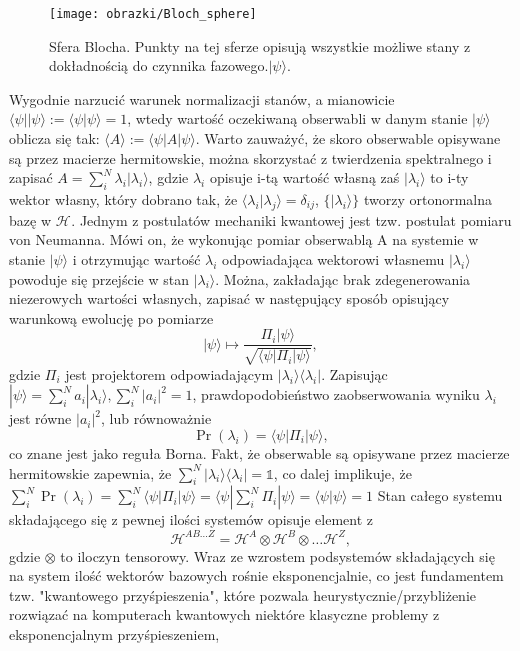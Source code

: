 \documentclass[10pt]{article} %
\newcommand{\Hx}[1]{\mathcal{H}^{#1}}
\newcommand{\Pro}[1]{\Pr(#1)}
\newcommand{\Ket}[1]{|#1\rangle}
\newcommand{\Bra}[1]{\langle#1|}
\newcommand{\Braket}[1]{\langle#1\rangle}
\newcommand{\KP}{\Ket{\psi}}
\newcommand{\BP}{\Bra{\psi}}
\begin{document}
\begin{figure}[t]
\centering
\texttt{[image: obrazki/Bloch\_sphere]}
\caption{Sfera Blocha. Punkty na tej sferze opisują wszystkie możliwe stany z dokładnością do czynnika fazowego.$\KP$.}
\label{fig:bloch}
\end{figure}
Wygodnie narzucić warunek normalizacji stanów, a mianowicie $\Bra{\psi}\Ket{\psi} := \Braket{\psi|\psi} = 1$, wtedy wartość oczekiwaną obserwabli w danym stanie $\Ket{\psi}$ oblicza się tak: $\Braket{A} := \Bra{\psi}A\Ket{\psi}$. Warto zauważyć, że skoro obserwable opisywane są przez macierze hermitowskie, można 
skorzystać z twierdzenia spektralnego i zapisać $A = \sum_i^N \lambda_i \Ket{\lambda_i}$, gdzie $\lambda_i$ opisuje i-tą wartość własną zaś $\Ket{\lambda_i}$ to i-ty wektor własny, który dobrano tak, że $\Braket{\lambda_i|\lambda_j} = \delta_{ij}$, $\{\Ket{\lambda_i}\}$ tworzy ortonormalna bazę w $\Hx{}$. Jednym z postulatów mechaniki kwantowej jest tzw. postulat pomiaru von Neumanna. Mówi on, że wykonując pomiar obserwablą A na systemie w stanie $\Ket{\psi}$ i otrzymując wartość $\lambda_i$ odpowiadająca wektorowi własnemu $\Ket{\lambda_i}$ powoduje się przejście w stan $\Ket{\lambda_i}$. Można, zakładając brak zdegenerowania niezerowych wartości własnych, zapisać w następujący sposób opisujący warunkową ewolucję po pomiarze 
\begin{equation}
\label{eq:cond_ev}
\Ket{\psi} \mapsto \frac{\Pi_i\Ket{\psi}}{\sqrt{\Bra{\psi}\Pi_i \Ket{\psi}}},
\end{equation}
gdzie $\Pi_i$ jest projektorem odpowiadającym $\Ket{\lambda_i}\Bra{\lambda_i}$. Zapisując $\KP = \sum^N_i a_i \Ket{\lambda_i}, \sum^N_i |a_i|^2=1$, prawdopodobieństwo zaobserwowania wyniku $\lambda_i$ jest równe $|a_i|^2$, lub równoważnie
\begin{equation}
\Pro{\lambda_i} = \BP \Pi_i \KP,
\end{equation}
co znane jest jako reguła Borna. Fakt, że obserwable są opisywane przez macierze hermitowskie zapewnia, że $\sum^N_i \Ket{\lambda_i}\Bra{\lambda_i} = \mathbb{1}$, co dalej implikuje, że $\sum^N_i \Pro{\lambda_i} = \sum^N_i \BP \Pi_i \KP = \BP \sum^N_i \Pi_i \KP = \Braket{\psi | \psi} = 1$
Stan całego systemu składającego się z pewnej ilości systemów opisuje element z
\begin{equation}
\Hx{AB\dots Z} = \Hx{A} \otimes \Hx{B} \otimes \dots \Hx{Z},
\end{equation}
gdzie $\otimes$ to iloczyn tensorowy. Wraz ze wzrostem podsystemów składających się na system ilość wektorów bazowych rośnie eksponencjalnie, co jest fundamentem tzw. "kwantowego przyśpieszenia", które pozwala heurystycznie/przybliżenie rozwiązać na komputerach kwantowych niektóre klasyczne problemy z eksponencjalnym przyśpieszeniem,
\end{document}
